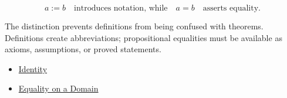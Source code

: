 \begin{remark*}
\[
a := b \quad\text{introduces notation, while}\quad a=b \quad\text{asserts equality.}
\]
\end{remark*}

\begin{remark*}[Interpretation]
The distinction prevents definitions from being confused with theorems.
Definitions create abbreviations; propositional equalities must be available
as axioms, assumptions, or proved statements.
\end{remark*}

\begin{dependencies}
\begin{itemize}
  \item \hyperref[def:identity-relation]{Identity}
  \item \hyperref[def:equality-relation]{Equality on a Domain}
\end{itemize}
\end{dependencies}
